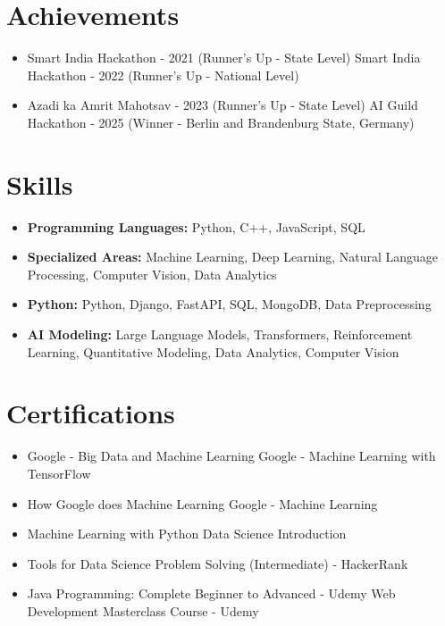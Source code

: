 \documentclass[a4paper,10pt]{article}
\begin{document}
\section*{Achievements}
\begin{itemize}
\item Smart India Hackathon - 2021 (Runner's Up - State Level) \hfill Smart India Hackathon - 2022 (Runner's Up - National Level)
\item Azadi ka Amrit Mahotsav - 2023 (Runner's Up - State Level) \hfill AI Guild Hackathon - 2025 (Winner - Berlin and Brandenburg State, Germany)
\end{itemize}

\section*{Skills}
\begin{itemize}
  \item \textbf{Programming Languages:} Python, C++, JavaScript, SQL
  \item \textbf{Specialized Areas:} Machine Learning, Deep Learning, Natural Language Processing, Computer Vision, Data Analytics
  \item \textbf{Python:} Python, Django, FastAPI, SQL, MongoDB, Data Preprocessing
  \item \textbf{AI Modeling:} Large Language Models, Transformers, Reinforcement Learning, Quantitative Modeling, Data Analytics, Computer Vision
\end{itemize}

\section*{Certifications}
\begin{itemize}
\item Google - Big Data and Machine Learning \hfill Google - Machine Learning with TensorFlow
\item How Google does Machine Learning \hfill Google - Machine Learning
\item Machine Learning with Python \hfill Data Science Introduction
\item Tools for Data Science \hfill Problem Solving (Intermediate) - HackerRank
\item Java Programming: Complete Beginner to Advanced - Udemy \hfill Web Development Masterclass Course - Udemy
\end{itemize}
\end{document}
